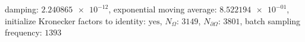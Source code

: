 damping: $\num[scientific-notation=true]{2.240865e-12}$, exponential moving average: $\num[scientific-notation=true]{8.522194e-01}$, initialize Kronecker factors to identity: $\text{yes}$, $N_{\Omega}$: $\num[scientific-notation=false]{3149}$, $N_{\partial\Omega}$: $\num[scientific-notation=false]{3801}$, batch sampling frequency: $\num[scientific-notation=false]{1393}$